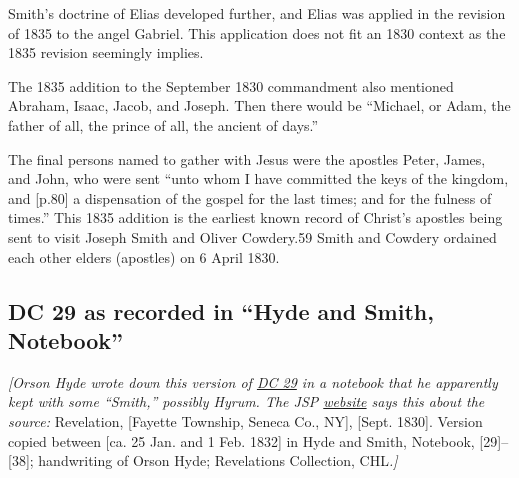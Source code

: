 		Smith's doctrine of Elias developed further, and Elias was applied in the revision of 1835 to the angel Gabriel. This application does not fit an 1830 context as the 1835 revision seemingly implies.

		The 1835 addition to the September 1830 commandment also mentioned Abraham, Isaac, Jacob, and Joseph. Then there would be ``Michael, or Adam, the father of all, the prince of all, the ancient of days.''

		The final persons named to gather with Jesus were the apostles Peter, James, and John, who were sent ``unto whom I have committed the keys of the kingdom, and [p.80] a dispensation of the gospel for the last times; and for the fulness of times.'' This 1835 addition is the earliest known record of Christ's apostles being sent to visit Joseph Smith and Oliver Cowdery.59 Smith and Cowdery ordained each other elders (apostles) on 6 April 1830.
		
	\subsection{DC 29 as recorded in ``Hyde and Smith, Notebook''}
		\label{EXSS-DC29-NOTEBOOK}
		
		\textit{[Orson Hyde wrote down this version of \hyperref[DC29]{DC 29} in a notebook that he apparently kept with some ``Smith,'' possibly Hyrum. The JSP \href{https://www.josephsmithpapers.org/paper-summary/revelation-september-1830-a-as-recorded-in-hyde-and-smith-notebook-dc-29/1}{website} says this about the source:} Revelation, [Fayette Township, Seneca Co., NY], [Sept. 1830]. Version copied between [ca. 25 Jan. and 1 Feb. 1832] in Hyde and Smith, Notebook, [29]--[38]; handwriting of Orson Hyde; Revelations Collection, CHL\textit{.]}
		
